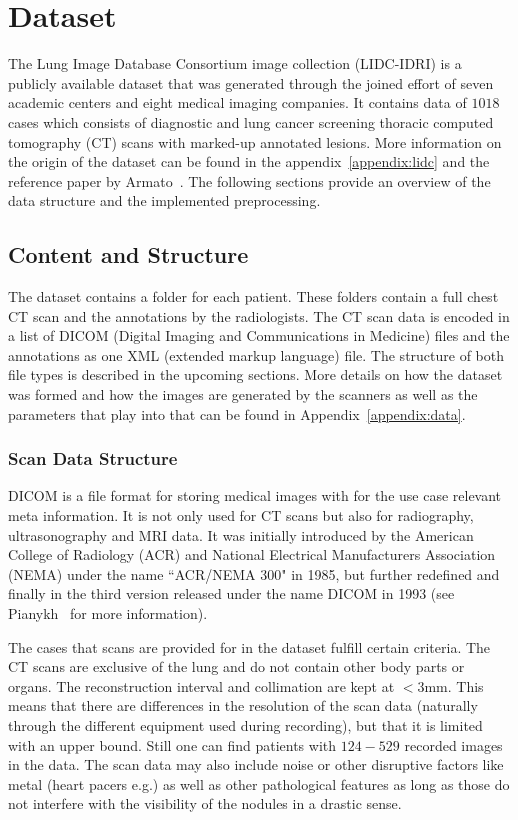 \documentclass[../Thesis.tex]{subfiles}
\begin{document}
\chapter{Dataset}\label{chap:data}
The Lung Image Database Consortium image collection (LIDC-IDRI) is a publicly available dataset that was generated through the joined effort of seven academic centers and eight medical imaging companies. It contains data of $1018$ cases which consists of diagnostic and lung cancer screening thoracic computed tomography (CT) scans with marked-up annotated lesions. More information on the origin of the dataset can be found in the appendix~\ref{appendix:lidc} and the reference paper by Armato~\cite{armato2011lung}. The following sections provide an overview of the data structure and the implemented preprocessing.

\section{Content and Structure}
The dataset contains a folder for each patient. These folders contain a full chest CT scan and the annotations by the radiologists. The CT scan data is encoded in a list of DICOM (Digital Imaging and Communications in Medicine) files and the annotations as one XML (extended markup language) file. The structure of both file types is described in the upcoming sections. More details on how the dataset was formed and how the images are generated by the scanners as well as the parameters that play into that can be found in Appendix~\ref{appendix:data}.

\subsection{Scan Data Structure}
DICOM is a file format for storing medical images with for the use case relevant meta information. It is not only used for CT scans but also for radiography, ultrasonography and MRI data. It was initially introduced by the American College of Radiology (ACR) and National Electrical Manufacturers Association (NEMA) under the name ``ACR/NEMA 300" in 1985, but further redefined and finally in the third version released under the name DICOM in 1993 (see Pianykh~\cite{pianykh2008} for more information).

The cases that scans are provided for in the dataset fulfill certain criteria. The CT scans are exclusive of the lung and do not contain other body parts or organs. The reconstruction interval and collimation are kept at $<3$mm. This means that there are differences in the resolution of the scan data (naturally through the different equipment used during recording), but that it is limited with an upper bound. Still one can find patients with $124-529$ recorded images in the data. The scan data may also include noise or other disruptive factors like metal (heart pacers e.g.) as well as other pathological features as long as those do not interfere with the visibility of the nodules in a drastic sense.
\end{document}
